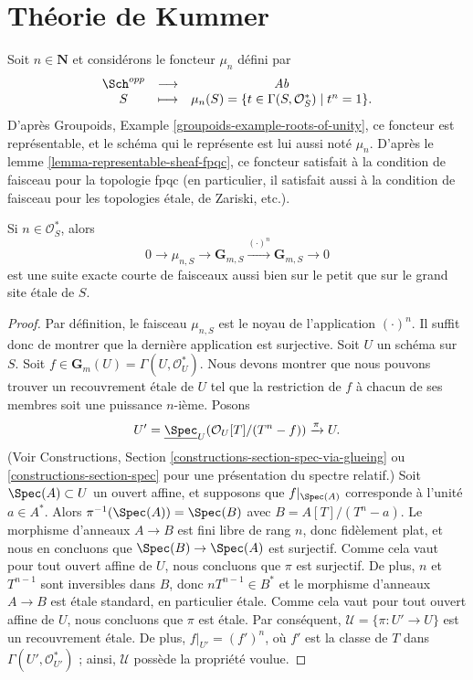 \section{Th\'eorie de Kummer}
\label{section-kummer}

\noindent
Soit $n \in \mathbf{N}$ et consid\'erons le foncteur $\mu_n$ d\'efini par
$$
\begin{matrix}
\Sch^{opp} & \longrightarrow & \textit{Ab} \\
S & \longmapsto &
\mu_n(S)
=
\{t \in \Gamma(S, \mathcal{O}_S^*) \mid t^n = 1 \}.
\end{matrix}
$$
D'apr\`es
Groupoids, Example \ref{groupoids-example-roots-of-unity},
ce foncteur est repr\'esentable, et le sch\'ema qui le repr\'esente
est lui aussi not\'e $\mu_n$. D'apr\`es le
lemme \ref{lemma-representable-sheaf-fpqc},
ce foncteur satisfait \`a la condition de faisceau pour la topologie fpqc
(en particulier, il satisfait aussi \`a la condition de faisceau pour les
topologies \'etale, de Zariski, etc.).

\begin{lemma}
\label{lemma-kummer-sequence}
Si $n\in \mathcal{O}_S^*$, alors
$$
0 \to
\mu_{n, S} \to
\mathbf{G}_{m, S} \xrightarrow{(\cdot)^n}
\mathbf{G}_{m, S} \to 0
$$
est une suite exacte courte de faisceaux aussi bien sur le petit que sur le
grand site \'etale de $S$.
\end{lemma}

\begin{proof}
Par d\'efinition, le faisceau $\mu_{n, S}$ est le noyau de l'application
$(\cdot)^n$. Il suffit donc de montrer que la derni\`ere application est surjective.
Soit $U$ un sch\'ema sur $S$. Soit
$f \in \mathbf{G}_m(U) = \Gamma(U, \mathcal{O}_U^*)$.
Nous devons montrer que nous pouvons trouver un recouvrement \'etale de
$U$ tel que la restriction de $f$ \`a chacun de ses membres soit une puissance $n$-i\`eme.
Posons
$$
U' =
\underline{\Spec}_U(\mathcal{O}_U[T]/(T^n-f))
\xrightarrow{\pi}
U.
$$
(Voir
Constructions, Section \ref{constructions-section-spec-via-glueing} ou
\ref{constructions-section-spec}
pour une pr\'esentation du spectre relatif.)
Soit $\Spec(A) \subset U$ un ouvert affine, et supposons que $f|_{\Spec(A)}$ corresponde
\`a l'unit\'e $a \in A^*$. Alors $\pi^{-1}(\Spec(A)) = \Spec(B)$ avec
$B = A[T]/(T^n - a)$. Le morphisme d'anneaux $A \to B$ est fini libre de rang $n$,
donc fid\`element plat, et nous en concluons que
$\Spec(B) \to \Spec(A)$ est surjectif. Comme cela vaut pour tout
ouvert affine de $U$, nous concluons que $\pi$ est surjectif.
De plus, $n$ et $T^{n - 1}$ sont inversibles dans $B$, donc
$nT^{n-1} \in B^*$ et le morphisme d'anneaux $A \to B$ est \'etale standard,
en particulier \'etale. Comme cela vaut pour tout ouvert affine de $U$,
nous concluons que $\pi$ est \'etale. Par cons\'equent,
$\mathcal{U} = \{\pi : U' \to U\}$ est un recouvrement \'etale.
De plus, $f|_{U'} = (f')^n$, o\`u $f'$ est la classe de $T$
dans $\Gamma(U', \mathcal{O}_{U'}^*)$ ; ainsi, $\mathcal{U}$ poss\`ede la propri\'et\'e voulue.
\end{proof}

